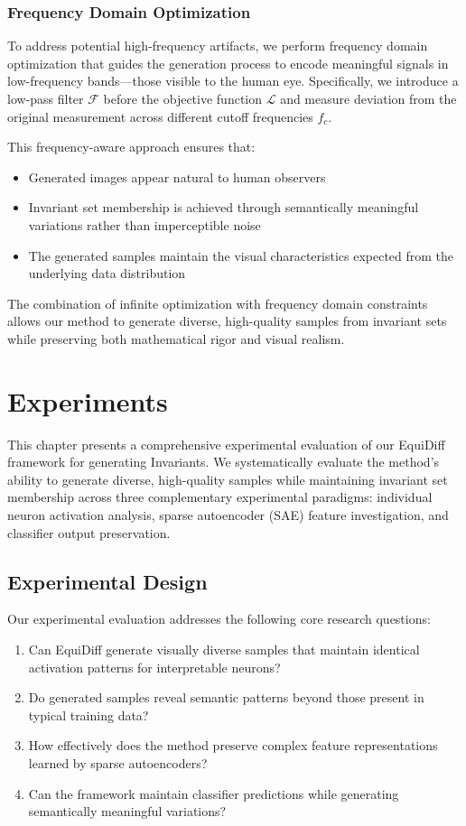 \documentclass[licencjacka,en]{pracamgr}
\newcommand{\method}[1]{EquiDiff}  %
\newcommand{\framework}[1]{Invariants}  %
\begin{document}
\subsection{Frequency Domain Optimization}

To address potential high-frequency artifacts, we perform frequency domain optimization that guides the generation process to encode meaningful signals in low-frequency bands---those visible to the human eye. Specifically, we introduce a low-pass filter $\mathcal{F}$ before the objective function $\mathcal{L}$ and measure deviation from the original measurement across different cutoff frequencies $f_c$.

This frequency-aware approach ensures that:
\begin{itemize}
  \item Generated images appear natural to human observers
  \item Invariant set membership is achieved through semantically meaningful variations rather than imperceptible noise
  \item The generated samples maintain the visual characteristics expected from the underlying data distribution
\end{itemize}

The combination of infinite optimization with frequency domain constraints allows our method to generate diverse, high-quality samples from invariant sets while preserving both mathematical rigor and visual realism.

\chapter{Experiments}\label{r:experiments}

This chapter presents a comprehensive experimental evaluation of our \method{} framework for generating \framework{}. We systematically evaluate the method's ability to generate diverse, high-quality samples while maintaining invariant set membership across three complementary experimental paradigms: individual neuron activation analysis, sparse autoencoder (SAE) feature investigation, and classifier output preservation.

\section{Experimental Design}

Our experimental evaluation addresses the following core research questions:
\begin{enumerate}
\item Can \method{} generate visually diverse samples that maintain identical activation patterns for interpretable neurons?
\item Do generated samples reveal semantic patterns beyond those present in typical training data?
\item How effectively does the method preserve complex feature representations learned by sparse autoencoders?
\item Can the framework maintain classifier predictions while generating semantically meaningful variations?
\end{enumerate}
\end{document}
